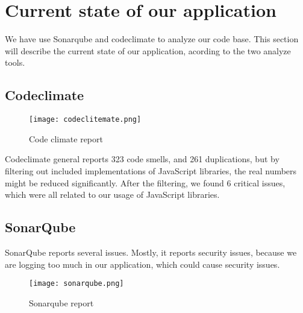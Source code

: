 \section{Current state of our application}

We have use Sonarqube and codeclimate to analyze our code base. This section will describe the current state of our application, acording to the two analyze tools.

\subsection*{Codeclimate}

\begin{figure}[H]
	\centering
	\texttt{[image: codeclitemate.png]}
	\caption{Code climate report}
	\label{fig:Code climate}
\end{figure}

Codeclimate general reports 323 code smells, and 261 duplications,
but by filtering out included implementations of JavaScript libraries, the real numbers might be reduced significantly.
After the filtering, we found 6 critical issues, which were all related to our usage of JavaScript libraries.

\subsection*{SonarQube}
SonarQube reports several issues. Mostly, it reports security issues, because we are logging too much in our application, which could cause security issues.
\begin{figure}[H]
	\centering
	\texttt{[image: sonarqube.png]}
	\caption{Sonarqube report}
	\label{fig:Sonarqube}
\end{figure}
